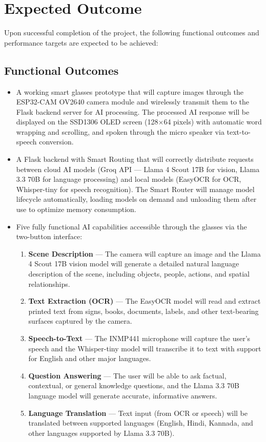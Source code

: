 \chapter{Expected Outcome}

Upon successful completion of the project, the following functional outcomes and performance targets are expected to be achieved:

\section{Functional Outcomes}
\begin{itemize}[leftmargin=1.5cm]
\item A working smart glasses prototype that will capture images through the ESP32-CAM OV2640 camera module and wirelessly transmit them to the Flask backend server for AI processing. The processed AI response will be displayed on the SSD1306 OLED screen (128$\times$64 pixels) with automatic word wrapping and scrolling, and spoken through the micro speaker via text-to-speech conversion.

\item A Flask backend with Smart Routing that will correctly distribute requests between cloud AI models (Groq API --- Llama 4 Scout 17B for vision, Llama 3.3 70B for language processing) and local models (EasyOCR for OCR, Whisper-tiny for speech recognition). The Smart Router will manage model lifecycle automatically, loading models on demand and unloading them after use to optimize memory consumption.

\item Five fully functional AI capabilities accessible through the glasses via the two-button interface:
\begin{enumerate}
\item \textbf{Scene Description} --- The camera will capture an image and the Llama 4 Scout 17B vision model will generate a detailed natural language description of the scene, including objects, people, actions, and spatial relationships.
\item \textbf{Text Extraction (OCR)} --- The EasyOCR model will read and extract printed text from signs, books, documents, labels, and other text-bearing surfaces captured by the camera.
\item \textbf{Speech-to-Text} --- The INMP441 microphone will capture the user's speech and the Whisper-tiny model will transcribe it to text with support for English and other major languages.
\item \textbf{Question Answering} --- The user will be able to ask factual, contextual, or general knowledge questions, and the Llama 3.3 70B language model will generate accurate, informative answers.
\item \textbf{Language Translation} --- Text input (from OCR or speech) will be translated between supported languages (English, Hindi, Kannada, and other languages supported by Llama 3.3 70B).
\end{enumerate}


\end{itemize}
